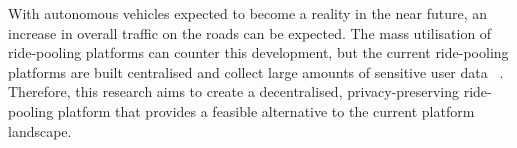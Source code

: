 
With autonomous vehicles expected to become a reality in the near future, an increase in overall traffic on the roads can be expected. The mass utilisation of ride-pooling platforms can counter this development, but the current ride-pooling platforms are built centralised and collect large amounts of sensitive user data ~\cite{Riel.2022}. Therefore, this research aims to create a decentralised, privacy-preserving ride-pooling platform that provides a feasible alternative to the current platform landscape.